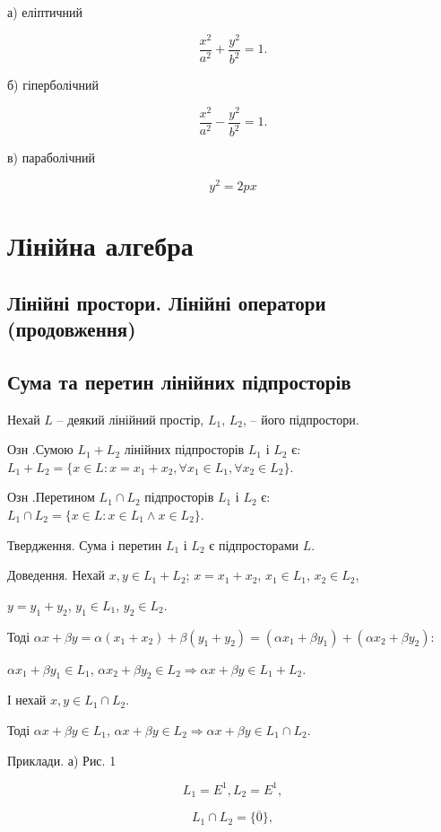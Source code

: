 а) еліптичний

$$\dfrac{x^2}{a^2} + \dfrac{y^2}{b^2} = 1.$$


б) гіперболічний

$$\dfrac{x^2}{a^2} - \dfrac{y^2}{b^2} = 1.$$


в) параболічний

$$y^2 = 2px$$


\section{Лінійна алгебра}


\subsection{Лінійні простори. Лінійні оператори (продовження)}

\subsection*{Сума та перетин лінійних підпросторів}

Нехай $L$ -- деякий лінійний простір, $L_1$, $L_2$, -- його підпростори.

Озн .Сумою $L_1 + L_2$ лінійних підпросторів $L_1$ і $L_2$ є:
$L_1 + L_2 = \{ x \in L: x = x_1 + x_2, \forall x_1 \in L_1, \forall x_2 \in L_2\}$.


Озн .Перетином $L_1 \cap L_2$ підпросторів $L_1$ і $L_2$ є:
$L_1 \cap L_2 = \{x \in L: x \in L_1 \wedge x \in L_2 \}$.


Твердження. Сума і перетин $L_1$ і $L_2$ є підпросторами $L$.


Доведення. Нехай $x,y \in L_1 + L_2$; $x = x_1 + x_2$, $x_1 \in L_1$, $x_2 \in L_2$,

$y = y_1 + y_2$, $y_1 \in L_1$, $y_2 \in L_2$.

Тоді $\alpha x + \beta y = \alpha(x_1 + x_2) + \beta(y_1 + y_2) = (\alpha x_1 + \beta y_1) + (\alpha x_2 + \beta y_2):$

$\alpha x_1 + \beta y_1 \in L_1$, $\alpha x_2 + \beta y_2 \in L_2 \Rightarrow \alpha x + \beta y \in L_1 + L_2.$

І нехай $x,y \in L_1 \cap L_2$.

Тоді $\alpha x + \beta y \in L_1$, $\alpha x + \beta y \in L_2 \Rightarrow \alpha x + \beta y \in L_1 \cap L_2$.


Приклади.
а)
Рис. 1

$$L_1 = E^1, L_2 = E^1,$$

$$L_1 \cap L_2 = \{\overline{0}\},$$

